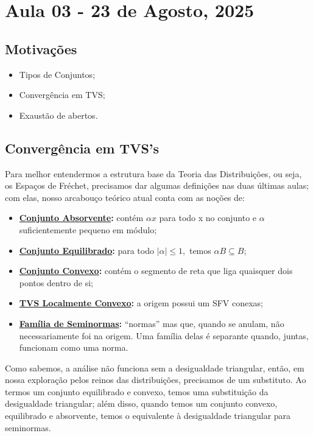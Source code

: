 \documentclass[../distribution_theory_notes.tex]{subfiles}
\begin{document}
\section{Aula 03 - 23 de Agosto, 2025}
\subsection{Motivações}
\begin{itemize}
 \item Tipos de Conjuntos; 
 \item Convergência em TVS;
 \item Exaustão de abertos.
\end{itemize}
\subsection{Convergência em TVS's}
  Para melhor entendermos a estrutura base da Teoria das Distribuições, ou seja, os Espaços de Fréchet, precisamos dar algumas definições nas duas últimas aulas; com elas, nosso arcabouço teórico atual conta com as noções de: 
 \begin{itemize}
   \item \textbf{\underline{Conjunto Absorvente}:} contém \(\alpha x\) para todo x no conjunto e \(\alpha \) suficientemente pequeno em módulo; 
   \item \textbf{\underline{Conjunto Equilibrado}:} para todo \(|\alpha |\leq 1,\) temos \(\alpha B \subseteq B\);
   \item \textbf{\underline{Conjunto Convexo}:} contém o segmento de reta que liga quaisquer dois pontos dentro de si;
   \item \textbf{\underline{TVS Localmente Convexo}:} a origem possui um SFV conexas;
   \item \textbf{\underline{Família de Seminormas}:} ``normas'' mas que, quando se anulam, não necessariamente foi na origem. Uma família delas é separante quando, juntas, funcionam como uma norma.
 \end{itemize}
   \begin{tcolorbox}[
   skin=enhanced,
   title=Observação,
   fonttitle=\bfseries,
 colframe=black,
   colbacktitle=cyan!75!white, 
   colback=cyan!15,
   colbacklower=black,
 coltitle=black,
   drop fuzzy shadow,
   ]
   Como sabemos, a análise não funciona sem a desigualdade triangular, então, em nossa exploração pelos reinos das distribuições, precisamos de um substituto. Ao termos um conjunto equilibrado e convexo, temos uma substituição da desigualdade triangular; além disso, quando temos um conjunto convexo, equilibrado e absorvente, temos o equivalente à desigualdade triangular para seminormas. 
   \end{tcolorbox}
\end{document}
